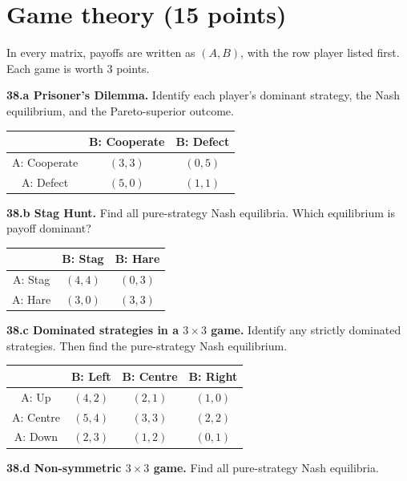 \documentclass[11pt,a4paper]{article}
\begin{document}
\newpage
\section{Game theory \hfill (15 points)}

In every matrix, payoffs are written as \((A,B)\), with the row player listed
first. Each game is worth 3 points.

\textbf{38.a Prisoner's Dilemma.} Identify each player's dominant strategy,
the Nash equilibrium, and the Pareto-superior outcome.

\begin{center}
\renewcommand{\arraystretch}{1.45}
\begin{tabular}{c|c|c}
 & B: Cooperate & B: Defect \\ \hline
A: Cooperate & \((3,3)\) & \((0,5)\)\\
A: Defect & \((5,0)\) & \((1,1)\)
\end{tabular}
\end{center}

\textbf{38.b Stag Hunt.} Find all pure-strategy Nash equilibria. Which
equilibrium is payoff dominant?

\begin{center}
\renewcommand{\arraystretch}{1.45}
\begin{tabular}{c|c|c}
 & B: Stag & B: Hare \\ \hline
A: Stag & \((4,4)\) & \((0,3)\)\\
A: Hare & \((3,0)\) & \((3,3)\)
\end{tabular}
\end{center}

\newpage
\textbf{38.c Dominated strategies in a \(3\times3\) game.} Identify any
strictly dominated strategies. Then find the pure-strategy Nash equilibrium.

\begin{center}
\renewcommand{\arraystretch}{1.45}
\begin{tabular}{c|c|c|c}
 & B: Left & B: Centre & B: Right \\ \hline
A: Up & \((4,2)\) & \((2,1)\) & \((1,0)\)\\
A: Centre & \((5,4)\) & \((3,3)\) & \((2,2)\)\\
A: Down & \((2,3)\) & \((1,2)\) & \((0,1)\)
\end{tabular}
\end{center}

\vspace{1.0em}
\textbf{38.d Non-symmetric \(3\times3\) game.} Find all pure-strategy Nash
equilibria.
\end{document}
